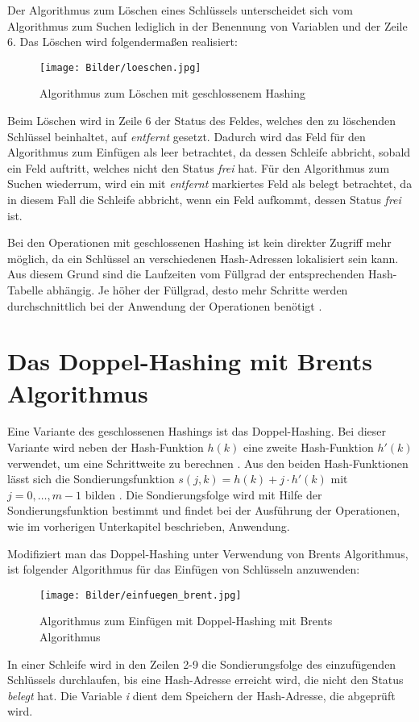 Der Algorithmus zum Löschen eines Schlüssels unterscheidet sich vom Algorithmus zum Suchen lediglich in der Benennung von Variablen und der Zeile 6. Das Löschen wird folgendermaßen realisiert:
\begin{figure}[H]
	\centering
	\texttt{[image: Bilder/loeschen.jpg]}
	\caption{Algorithmus zum Löschen mit geschlossenem Hashing}
	\label{ht_loeschen}
	\quelle \cite[S.~243]{ADSWeiWei}
\end{figure}
Beim Löschen wird in Zeile 6 der Status des Feldes, welches den zu löschenden Schlüssel beinhaltet, auf \textit{entfernt} gesetzt. Dadurch wird das Feld für den Algorithmus zum Einfügen als leer betrachtet, da dessen Schleife abbricht, sobald ein Feld auftritt, welches nicht den Status \textit{frei} hat. Für den Algorithmus zum Suchen wiederrum, wird ein mit \textit{entfernt} markiertes Feld als belegt betrachtet, da in diesem Fall die Schleife abbricht, wenn ein Feld aufkommt, dessen Status \textit{frei} ist.

Bei den Operationen mit geschlossenen Hashing ist kein direkter Zugriff mehr möglich, da ein Schlüssel an verschiedenen Hash-Adressen lokalisiert sein kann. Aus diesem Grund sind die Laufzeiten vom Füllgrad der entsprechenden Hash-Tabelle abhängig. Je höher der Füllgrad, desto mehr Schritte werden durchschnittlich bei der Anwendung der Operationen benötigt \cite[S.~211]{ADSOttWid}.

\section{Das Doppel-Hashing mit Brents Algorithmus}\label{brent}
Eine Variante des geschlossenen Hashings ist das Doppel-Hashing. Bei dieser Variante wird neben der Hash-Funktion \(h(k)\) eine zweite Hash-Funktion \(h'(k)\) verwendet, um eine Schrittweite zu berechnen \cite[S.~247]{ADSWeiWei}. Aus den beiden Hash-Funktionen lässt sich die Sondierungsfunktion \(s(j,k) = h(k)+j\cdot{}h'(k)\) mit \(j=0, \dots{},m-1\) bilden \cite[S.~275]{algoeinf}. Die Sondierungsfolge wird mit Hilfe der Sondierungsfunktion bestimmt und findet bei der Ausführung der Operationen, wie im vorherigen Unterkapitel beschrieben, Anwendung.

Modifiziert man das Doppel-Hashing unter Verwendung von Brents Algorithmus, ist folgender Algorithmus für das Einfügen von Schlüsseln anzuwenden:
\begin{figure}[H]
	\centering
	\texttt{[image: Bilder/einfuegen\_brent.jpg]}
	\caption{Algorithmus zum Einfügen mit Doppel-Hashing mit Brents Algorithmus}
	\label{ht_einfuegen_brent}
	\quelle \cite[S.~250]{ADSWeiWei}
\end{figure}
In einer Schleife wird in den Zeilen 2-9 die Sondierungsfolge des einzufügenden Schlüssels durchlaufen, bis eine Hash-Adresse erreicht wird, die nicht den Status \textit{belegt} hat. Die Variable \textit{i} dient dem Speichern der Hash-Adresse, die abgeprüft wird.

